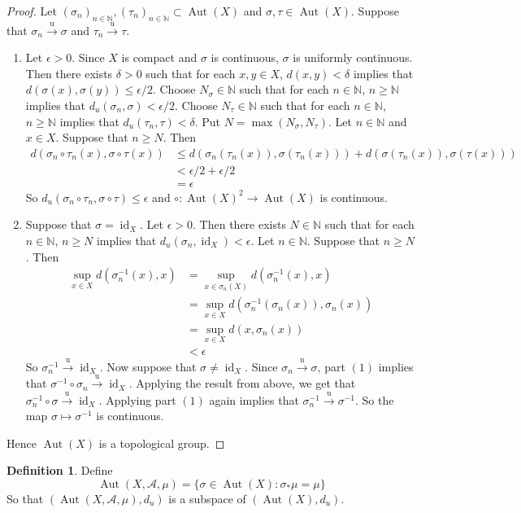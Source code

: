 \documentclass[12pt]{amsart}
\theoremstyle{definition}
\newtheorem{defn}[definition]{Definition}
\newcommand{\del}{\delta}
\newcommand{\ep}{\epsilon}
\newcommand{\sig}{\sigma}
\newcommand{\N}{\mathbb{N}}
\newcommand{\MA}{\mathcal{A}}
\newcommand{\convt}[1]{\xrightarrow{\text{#1}}}
\DeclareMathOperator{\id}{id}
\DeclareMathOperator{\Aut}{Aut}
\begin{document}
	\begin{proof}
	Let $(\sig_n)_{n \in \N}, (\tau_n)_{n \in \N} \subset \Aut(X)$ and $\sig,\tau \in \Aut(X)$. Suppose that $\sig_n \convt{u} \sig$ and $\tau_n \convt{u} \tau$.
	\begin{enumerate}
	\item Let $\ep >0$. Since $X$ is compact and $\sig$ is continuous, $\sig$ is uniformly continuous. Then there exists $\del >0$ such that for each $x, y \in X$, $d(x,y) < \del$ implies that $d(\sig(x), \sig(y)) \leq \ep/2$.  Choose $N_\sig \in \N$ such that for each $n \in \N$, $ n \geq \N$ implies that $d_u(\sig_n, \sig) < \ep/2$. Choose $N_\tau \in \N$ such that for each $n \in \N$, $ n \geq \N$ implies that $d_u(\tau_n, \tau) < \del$. Put $N = \max(N_\sig, N_\tau)$. Let $n \in \N$ and $x \in X$. Suppose that $n \geq N$. Then 
	\begin{align*}
		d(\sig_n \circ \tau_n (x) ,\sig \circ \tau (x) ) 
		&\leq  d(\sig_n(\tau_n(x)),  \sig(\tau_n(x))) + d( \sig(\tau_n (x)), \sig( \tau (x))) \\
		& < \ep / 2 +\ep / 2 \\
		&= \ep 
	\end{align*}
	So $d_u(\sig_n \circ \tau_n, \sig\circ \tau) \leq \ep$ and $\circ: \Aut(X)^2 \rightarrow \Aut(X)$ is continuous. 
	\item Suppose that $\sig = \id_X$. Let $\ep >0$. Then there exists $N \in \N$ such that for each $n \in \N$, $n \geq N$ implies that $d_u(\sig_n, \id_X) < \ep$. Let $n \in \N$. Suppose that $n \geq N$. Then 
	\begin{align*}
	\sup_{x \in X} d(\sig^{-1}_n(x), x) 
	&= \sup_{x \in \sig_n(X)}d(\sig^{-1}_n(x), x) \\
	&= \sup_{x \in X}d(\sig^{-1}_n(\sig_n(x)), \sig_n(x)) \\
	&= \sup_{x \in X}d(x, \sig_n(x)) \\
	&< \ep
	\end{align*}
	So $\sig^{-1}_n \convt{u} \id_X$. Now suppose that $\sig \neq \id_X$. Since $\sig_n \convt{u} \sig$, part $(1)$ implies that $\sig^{-1} \circ \sig_n \convt{u} \id_X$. Applying the result from above, we get that $\sig_n^{-1} \circ \sig \convt{u} \id_X$. Applying part $(1)$ again implies that $\sig_n^{-1}  \convt{u}  \sig^{-1}$. So the map $\sig \mapsto \sig^{-1}$ is continuous. 
	\end{enumerate}
	Hence $\Aut(X)$ is a topological group. 
	\end{proof}
	
	\begin{defn}
	Define $$\Aut(X, \MA, \mu) = \{\sig \in \Aut(X): \sig_* \mu = \mu\}$$ So that $(\Aut(X, \MA, \mu), d_{u} )$ is a subspace of $(\Aut(X), d_{u})$.
	\end{defn}
	
\end{document}
